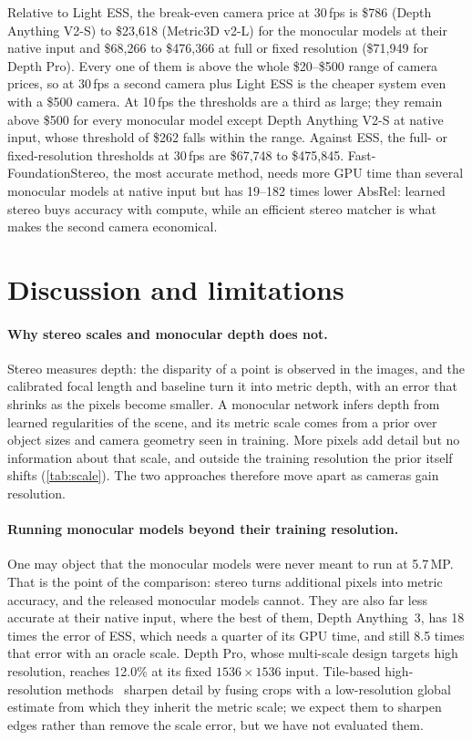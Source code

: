 \documentclass[10pt,twocolumn]{article}
\begin{document}
Relative to Light ESS, the break-even camera price at 30\,fps is \$786 (Depth Anything V2-S) to
\$23{,}618 (Metric3D v2-L) for the monocular models at their native input and \$68{,}266 to \$476{,}366 at
full or fixed resolution (\$71{,}949 for Depth Pro). Every one of them is above the whole \$20--\$500
range of camera prices, so at 30\,fps a second camera plus Light ESS is the cheaper system even with a
\$500 camera. At 10\,fps the thresholds are a third as large; they remain above \$500 for every monocular
model except Depth Anything V2-S at native input, whose threshold of \$262 falls within the range. Against ESS, the full- or fixed-resolution thresholds at 30\,fps
are \$67{,}748 to \$475{,}845. Fast-FoundationStereo, the most accurate method, needs more GPU time than
several monocular models at native input but has 19--182 times lower AbsRel: learned stereo buys
accuracy with compute, while an efficient stereo matcher is what makes the second camera economical.

\section{Discussion and limitations}

\paragraph{Why stereo scales and monocular depth does not.} Stereo measures depth: the disparity of
a point is observed in the images, and the calibrated focal length and baseline turn it into metric
depth, with an error that shrinks as the pixels become smaller. A monocular network infers depth from
learned regularities of the scene, and its metric scale comes from a prior over object sizes and camera
geometry seen in training. More pixels add detail but no information about that scale, and outside the
training resolution the prior itself shifts (\cref{tab:scale}). The two approaches therefore move apart
as cameras gain resolution.

\paragraph{Running monocular models beyond their training resolution.} One may object that the
monocular models were never meant to run at 5.7\,MP. That is the point of the comparison: stereo turns
additional pixels into metric accuracy, and the released monocular models cannot. They are also far
less accurate at their native input, where the best of them, Depth Anything~3, has 18 times the error
of ESS, which needs a quarter of its GPU time, and still 8.5 times that error with an oracle scale. Depth Pro, whose multi-scale design targets high resolution, reaches 12.0\% at its fixed
$1536\times1536$ input. Tile-based high-resolution methods~\cite{li2024patchfusion,li2024patchrefiner}
sharpen detail by fusing crops with a low-resolution global estimate from which they inherit the metric
scale; we expect them to sharpen edges rather than remove the scale error, but we have not evaluated
them.
\end{document}
